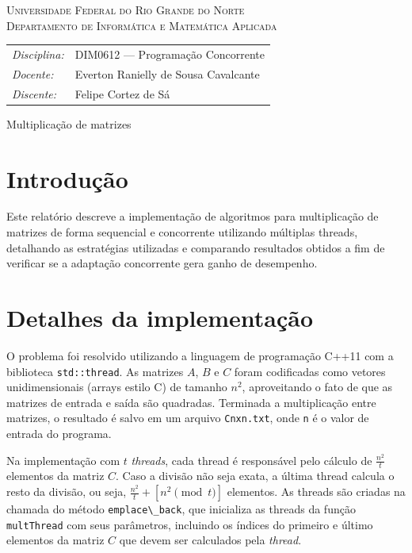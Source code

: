 \documentclass[12pt, a4paper]{article}
\newcommand{\code}[1]{{\lstinline{#1}}}
\begin{document}
\begin{center}
    \textsc{Universidade Federal do Rio Grande do Norte} \\
    \textsc{Departamento de Informática e Matemática Aplicada}
\end{center}

\bigskip

\begin{tabular}{@{}ll@{}}
    \emph{Disciplina:} & DIM0612 --- Programação Concorrente \\
    \emph{Docente:}    & Everton Ranielly de Sousa Cavalcante \\
    \emph{Discente:}   & Felipe Cortez de Sá \\
\end{tabular}

\bigskip

\begin{center}
\large Multiplicação de matrizes
\end{center}

\bigskip

\section{Introdução}
Este relatório descreve a implementação de algoritmos para multiplicação de
matrizes de forma sequencial e concorrente utilizando múltiplas threads,
detalhando as estratégias utilizadas e comparando resultados obtidos a fim de
verificar se a adaptação concorrente gera ganho de desempenho.

\section{Detalhes da implementação}
O problema foi resolvido utilizando a linguagem de programação C++11 com a
biblioteca \code{std::thread}. As matrizes $ A $, $ B $ e $ C $ foram
codificadas como vetores unidimensionais (arrays estilo C) de tamanho $ n^2 $,
aproveitando o fato de que as matrizes de entrada e saída são quadradas.
Terminada a multiplicação entre matrizes, o resultado é salvo em um arquivo
\code{Cnxn.txt}, onde \code{n} é o valor de entrada do programa.

Na implementação com $ t $ \emph{threads}, cada thread é responsável pelo
cálculo de $ \frac{n^2}{t} $ elementos da matriz $ C $. Caso a divisão não seja
exata, a última thread calcula o resto da divisão, ou seja, $ \frac{n^2}{t} +
\left[ n^2 \pmod t \right] $ elementos. As threads são criadas na chamada do
método \code{emplace\_back}, que inicializa as threads da função
\code{multThread} com seus parâmetros, incluindo os índices do primeiro e
último elementos da matriz $ C $ que devem ser calculados pela \emph{thread}.
\end{document}

